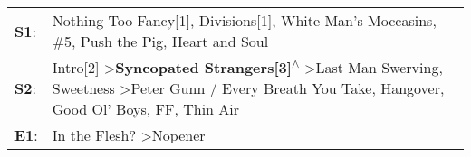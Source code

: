 \begin{supertabular}{p{0.03\textwidth}p{0.92\textwidth}}
 \textbf{S1}:  &                                                                                                                                                                                      Nothing Too Fancy[1]\textsuperscript{}, \enspace Divisions[1]\textsuperscript{}, \enspace White Man's Moccasins\textsuperscript{}, \enspace \#5\textsuperscript{}, \enspace Push the Pig\textsuperscript{}, \enspace Heart and Soul\textsuperscript{}  \enspace  \\
 \textbf{S2}:  &  Intro[2]\textsuperscript{} \textgreater \enspace \textbf{Syncopated Strangers[3]\textsuperscript{$\wedge$}} \textgreater \enspace Last Man Swerving\textsuperscript{}, \enspace Sweetness\textsuperscript{} \textgreater \enspace Peter Gunn / Every Breath You Take\textsuperscript{}, \enspace Hangover\textsuperscript{}, \enspace Good Ol' Boys\textsuperscript{}, \enspace FF\textsuperscript{}, \enspace Thin Air\textsuperscript{}  \enspace  \\
 \textbf{E1}:  &                                                                                                                                                                                                                                                                                                                                                            In the Flesh?\textsuperscript{} \textgreater \enspace Nopener\textsuperscript{}  \enspace  \\
\end{supertabular}
